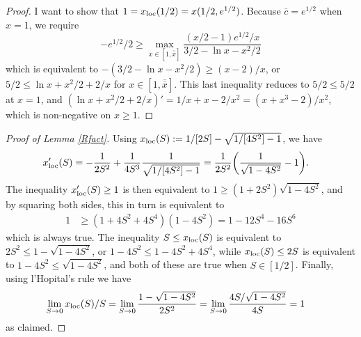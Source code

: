 \documentclass[11pt]{article}
\theoremstyle{plain}
\theoremstyle{definition} %
\begin{document}
\begin{proof} %
I want to show that $1 = x_{\textnormal{loc}}(1/2) = x(1/2, e^{1/2})$. Because $\overline{c} = e^{1/2}$ when $x=1$, we require
$$
-e^{1/2}/2 \geq \max_{x\in [1,\overline{\overline{x}}]} \frac{(x/2-1)e^{1/2}/x}{3/2 - \ln x - x^2/2}
$$
which is equivalent to $-(3/2 - \ln x - x^2/2) \geq (x-2)/x$, or $5/2 \leq \ln x + x^2/2 + 2/x$ for $x\in [1,\overline{\overline{x}}]$. This last inequality reduces to $5/2 \leq 5/2$ at $x=1$, and $(\ln x + x^2/2 + 2/x)' = 1/x + x - 2/x^2 = (x + x^3 - 2)/x^2$, which is non-negative on $x\geq1$.
\end{proof}

\begin{proof}[Proof of Lemma \ref{Rfact}] %
Using $x_{\textnormal{loc}}(S) := 1/[2S] - \sqrt{1/[4S^2] - 1}$, we have 
\begin{align*} 
x_{\textnormal{loc}}'(S) & = -\frac{1}{2S^2} + \frac{1}{4S^3} \frac{1}{\sqrt{1/[4S^2] - 1}}
 = \frac{1}{2S^2} {\left( \frac{1}{\sqrt{1 - 4S^2}} - 1 \right)}.
\end{align*}
The inequality $x_{\textnormal{loc}}'(S) \geq 1$ is then equivalent to $1 \geq (1 + 2S^2)\sqrt{1 - 4S^2}$, and by squaring both sides, this in turn is equivalent to 
\begin{align*} 
1 & \geq (1 + 4S^2 + 4S^4)(1 - 4S^2) %
 = 1 - 12S^4 - 16S^6 
\end{align*}
which is always true. The inequality $S \leq x_{\textnormal{loc}}(S)$ is equivalent to $2S^2 \leq 1 - \sqrt{1 - 4S^2}$, or $1 - 4S^2 \leq 1 - 4S^2 + 4S^4$, while $x_{\textnormal{loc}}(S) \leq 2S$ is equivalent to $1 - 4S^2 \leq \sqrt{1 - 4S^2}$, and both of these are true when $S \in [1/2]$. Finally, using l'Hopital's rule we have 
\begin{align*}
\lim_{S \rightarrow 0} x_{\textnormal{loc}}(S)/S & = \lim_{S \rightarrow 0} \frac{1 - \sqrt{1 - 4S^2}}{2S^2}
 = \lim_{S \rightarrow 0} \frac{4S/\sqrt{1 - 4S^2}}{4S} = 1
\end{align*}
as claimed. 
\end{proof}
\end{document}
